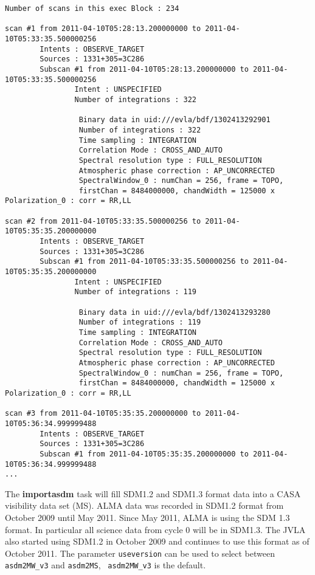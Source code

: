 \begin{verbatim}
Number of scans in this exec Block : 234

scan #1 from 2011-04-10T05:28:13.200000000 to 2011-04-10T05:33:35.500000256
        Intents : OBSERVE_TARGET
        Sources : 1331+305=3C286
        Subscan #1 from 2011-04-10T05:28:13.200000000 to 2011-04-10T05:33:35.500000256
                Intent : UNSPECIFIED
                Number of integrations : 322

                 Binary data in uid:///evla/bdf/1302413292901
                 Number of integrations : 322
                 Time sampling : INTEGRATION
                 Correlation Mode : CROSS_AND_AUTO
                 Spectral resolution type : FULL_RESOLUTION
                 Atmospheric phase correction : AP_UNCORRECTED
                 SpectralWindow_0 : numChan = 256, frame = TOPO,
                 firstChan = 8484000000, chandWidth = 125000 x Polarization_0 : corr = RR,LL

scan #2 from 2011-04-10T05:33:35.500000256 to 2011-04-10T05:35:35.200000000
        Intents : OBSERVE_TARGET
        Sources : 1331+305=3C286
        Subscan #1 from 2011-04-10T05:33:35.500000256 to 2011-04-10T05:35:35.200000000
                Intent : UNSPECIFIED
                Number of integrations : 119

                 Binary data in uid:///evla/bdf/1302413293280
                 Number of integrations : 119
                 Time sampling : INTEGRATION
                 Correlation Mode : CROSS_AND_AUTO
                 Spectral resolution type : FULL_RESOLUTION
                 Atmospheric phase correction : AP_UNCORRECTED
                 SpectralWindow_0 : numChan = 256, frame = TOPO,
                 firstChan = 8484000000, chandWidth = 125000 x Polarization_0 : corr = RR,LL

scan #3 from 2011-04-10T05:35:35.200000000 to 2011-04-10T05:36:34.999999488
        Intents : OBSERVE_TARGET
        Sources : 1331+305=3C286
        Subscan #1 from 2011-04-10T05:35:35.200000000 to 2011-04-10T05:36:34.999999488
...
\end{verbatim}
\normalsize

The {\bf importasdm} task will fill SDM1.2 and SDM1.3 format data into
a CASA visibility data set (MS). ALMA data was recorded in SDM1.2
format from October 2009 until May 2011. Since May 2011, ALMA is using
the SDM 1.3 format. In particular all science data from cycle 0 will
be in SDM1.3. The JVLA also started using SDM1.2 in October 2009 and
continues to use this format as of October 2011. The parameter {\tt useversion} can
be used to select between {\tt asdm2MW\_v3} and {\tt asdm2MS}, {\tt
  asdm2MW\_v3} is the default.




